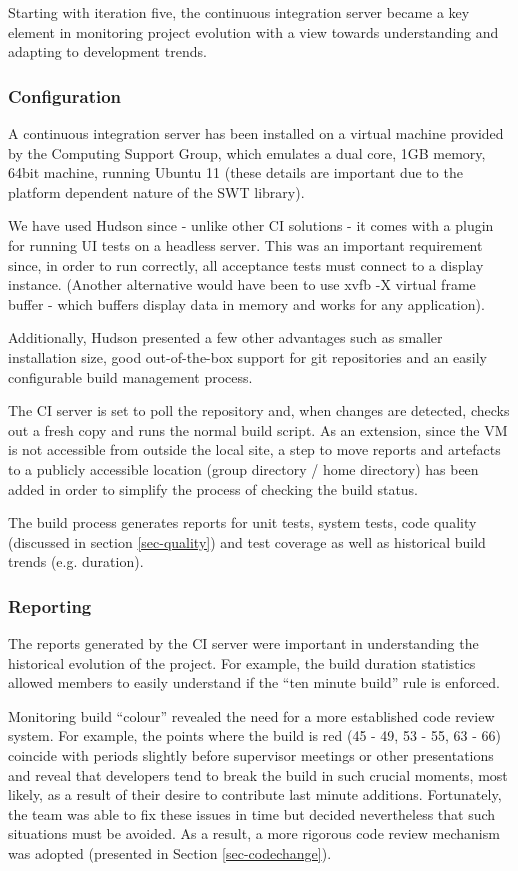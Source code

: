 \documentclass[10pt]{report}
\begin{document}
Starting with iteration five, the continuous integration server became a key element in monitoring project evolution with a view towards understanding and adapting to development trends.

\subsubsection{Configuration}
A continuous integration server has been installed on a virtual machine provided by the Computing Support Group, which emulates a dual core, 1GB memory, 64bit machine, running Ubuntu 11 (these details are important due to the platform dependent nature of the SWT library).

We have used Hudson since - unlike other CI solutions - it comes with a plugin for running UI tests on a headless server. This was an important requirement since, in order to run correctly, all acceptance tests must connect to a display instance. (Another alternative would have been to use xvfb -X virtual frame buffer - which buffers display data in memory and works for any application).

Additionally, Hudson presented a few other advantages such as smaller installation size, good out-of-the-box support for git repositories and an easily configurable build management process.

The CI server is set to poll the repository and, when changes are detected, checks out a fresh copy and runs the normal build script. As an extension, since the VM is not accessible from outside the local site, a step to move reports and artefacts to a publicly accessible location (group directory / home directory) has been added in order to simplify the process of checking the build status.

The build process generates reports for unit tests, system tests, code quality (discussed in section \ref{sec-quality}) and test coverage as well as historical build trends (e.g. duration).

\subsubsection{Reporting}
\label{sec-reporting}
The reports generated by the CI server were important in understanding the historical evolution of the project. For example, the build duration statistics allowed members to easily understand if the ``ten minute build'' rule is enforced.

Monitoring build ``colour'' revealed the need for a more established code review system. For example, the points where the build is red (45 - 49, 53 - 55, 63 - 66) coincide with periods slightly before supervisor meetings or other presentations and reveal that developers tend to break the build in such crucial moments, most likely, as a result of their desire to contribute last minute additions. Fortunately, the team was able to fix these issues in time but decided nevertheless that such situations must be avoided. As a result, a more rigorous code review mechanism was adopted (presented in Section \ref{sec-codechange}).
\end{document}
